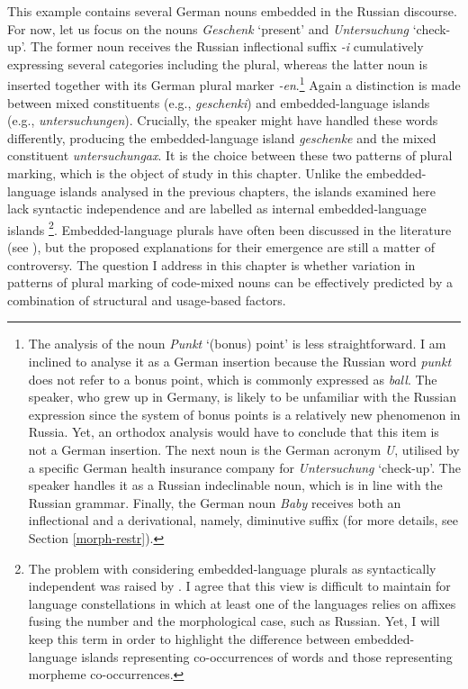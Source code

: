 \noindent This example contains several German nouns embedded in the Russian discourse. For now, let us focus on the nouns \textit{Geschenk} ‘present’ and \textit{Untersuchung} ‘check-up’. The former noun receives the Russian inflectional suffix \textit{-i} cumulatively expressing several categories including the plural, whereas the latter noun is inserted together with its German plural marker \textit{-en}.\footnote{The analysis of the noun \textit{Punkt} ‘(bonus) point’ is less straightforward. I am inclined to analyse it as a German insertion because the Russian word \textit{punkt} does not refer to a bonus point, which is commonly expressed as \textit{ball}. The speaker, who grew up in Germany, is likely to be unfamiliar with the Russian expression since the system of bonus points is a relatively new phenomenon in Russia. Yet, an orthodox analysis would have to conclude that this item is not a German insertion. The next noun is the German acronym \textit{U}, utilised by a specific German health insurance company for \textit{Untersuchung} ‘check-up’. The speaker handles it as a Russian indeclinable noun, which is in line with the Russian grammar. Finally, the German noun \textit{Baby} receives both an inflectional and a derivational, namely, diminutive suffix (for more details, see Section \ref{morph-restr}).} Again a distinction is made between mixed constituents (e.g., \textit{geschenki}) and embedded-language islands (e.g., \textit{untersuchungen}). Crucially, the speaker might have handled these words differently, producing the embedded-language island \textit{geschenke} and the mixed constituent \textit{untersuchungax}. It is the choice between these two patterns of plural marking, which is the object of study in this chapter. Unlike the embedded-language islands analysed in the previous chapters, the islands examined here lack syntactic independence and are labelled as internal embedded-language islands \citep[][149--150]{myers-scotton-contact-2002}\footnote{The problem with considering embedded-language plurals as syntactically independent was raised by \cite[][36--37]{boumans-syntax-1998}. I agree that this view is difficult to maintain for language constellations in which at least one of the languages relies on affixes fusing the number and the morphological case, such as Russian. Yet, I will keep this term in order to highlight the difference between embedded-language islands representing co-occurrences of words and those representing morpheme co-occurrences.}. Embedded-language plurals have often been discussed in the literature (see \citealt{backus-two-1996, backus-evidence-1999, backus-units-2003, boumans-syntax-1998, muhamedowa-untersuchung-2006,myers-scotton-duelling-1993, myers-scotton-contact-2002}), but the proposed explanations for their emergence are still a matter of controversy. The question I address in this chapter is whether variation in patterns of plural marking of code-mixed nouns can be effectively predicted by a combination of structural and usage-based factors.

